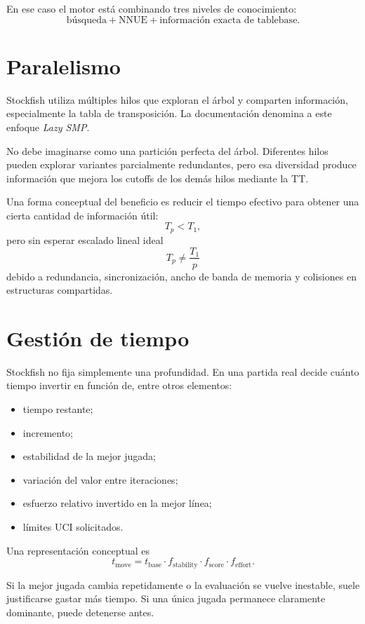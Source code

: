\documentclass[11pt,a4paper]{article}
\begin{document}
En ese caso el motor está combinando tres niveles de conocimiento:
\[
\text{búsqueda} + \text{NNUE} + \text{información exacta de tablebase}.
\]

\section{Paralelismo}

Stockfish utiliza múltiples hilos que exploran el árbol y comparten información, especialmente la tabla de transposición. La documentación denomina a este enfoque \emph{Lazy SMP}.

No debe imaginarse como una partición perfecta del árbol. Diferentes hilos pueden explorar variantes parcialmente redundantes, pero esa diversidad produce información que mejora los cutoffs de los demás hilos mediante la TT.

Una forma conceptual del beneficio es reducir el tiempo efectivo para obtener una cierta cantidad de información útil:
\[
T_p < T_1,
\]
pero sin esperar escalado lineal ideal
\[
T_p \neq \frac{T_1}{p}
\]
debido a redundancia, sincronización, ancho de banda de memoria y colisiones en estructuras compartidas.

\section{Gestión de tiempo}

Stockfish no fija simplemente una profundidad. En una partida real decide cuánto tiempo invertir en función de, entre otros elementos:
\begin{itemize}
    \item tiempo restante;
    \item incremento;
    \item estabilidad de la mejor jugada;
    \item variación del valor entre iteraciones;
    \item esfuerzo relativo invertido en la mejor línea;
    \item límites UCI solicitados.
\end{itemize}

Una representación conceptual es
\[
 t_{\mathrm{move}}
 = t_{\mathrm{base}}\cdot
 f_{\mathrm{stability}}\cdot
 f_{\mathrm{score}}\cdot
 f_{\mathrm{effort}}.
\]

Si la mejor jugada cambia repetidamente o la evaluación se vuelve inestable, suele justificarse gastar más tiempo. Si una única jugada permanece claramente dominante, puede detenerse antes.
\end{document}

